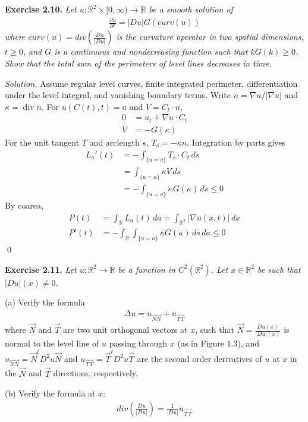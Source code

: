\documentclass[12pt,letterpaper]{article}
\newcommand{\R}{\mathbb R}
\newcommand{\diver}{\operatorname{div}}
\newcommand{\exercise}[1]{%
  \par\bigskip\noindent\textbf{Exercise #1.}\enspace}
\newenvironment{statement}{\itshape\ignorespaces}{\par}
\newcommand{\solution}{\par\medskip\noindent\textit{Solution.}\enspace}
\newcommand{\finish}{\qed\par}
\begin{document}
\begin{samepage}
\exercise{2.10}
\begin{statement}
Let $u:\mathbb R^2\times[0,\infty)\to\mathbb R$ be a smooth solution of
\begin{align*}
\frac{\partial u}{\partial t}=|Du|G(curv(u))
\end{align*}
where $curv(u)=div\left(\frac{Du}{|Du|}\right)$ is the curvature operator in two spatial dimensions, $t\ge0$, and $G$ is a continuous and nondecreasing function such that $kG(k)\ge0$. Show that the total sum of the perimeters of level lines decreases in time.
\end{statement}
\end{samepage}

\solution
Assume regular level curves, finite integrated perimeter, differentiation
under the level integral, and vanishing boundary terms. Write $n=\nabla u/|\nabla u|$ and $\kappa=\diver n$.
For $u(C(t),t)=a$ and $V=C_t\cdot n$,
\begin{align*}
 0&=u_t+\nabla u\cdot C_t\\
 V&=-G(\kappa)
\end{align*}
For the unit tangent $T$ and arclength $s$, $T_s=-\kappa n$.
Integration by parts gives
\begin{align*}
 L_a'(t)&=-\int_{\{u=a\}}T_s\cdot C_t\,ds\\
 &=\int_{\{u=a\}}\kappa V\,ds\\
 &=-\int_{\{u=a\}}\kappa G(\kappa)\,ds\le0
\end{align*}
By coarea,
\begin{align*}
 P(t)&=\int_\R L_a(t)\,da
       =\int_{\R^2}|\nabla u(x,t)|\,dx\\
 P'(t)&=-\int_\R\int_{\{u=a\}}\kappa G(\kappa)\,ds\,da\le0
\end{align*}
\finish

\newpage
\begin{samepage}
\exercise{2.11}
\begin{statement}
Let $u:\mathbb R^2\to\mathbb R$ be a function in $C^2(\mathbb R^2)$. Let $x\in\mathbb R^2$ be such that $|Du|(x)\ne0$.
\par\smallskip
(a) Verify the formula
\begin{align*}
\Delta u=u_{\vec N\vec N}+u_{\vec T\vec T}
\end{align*}
where $\vec N$ and $\vec T$ are two unit orthogonal vectors at $x$, such that $\vec N=\frac{Du(x)}{|Du|(x)}$ is normal to the level line of $u$ passing through $x$ (as in Figure 1.3), and $u_{\vec N\vec N}=\vec N^tD^2u\vec N$ and $u_{\vec T\vec T}=\vec T^tD^2u\vec T$ are the second order derivatives of $u$ at $x$ in the $\vec N$ and $\vec T$ directions, respectively.
\par\smallskip
(b) Verify the formula at $x$:
\begin{align*}
div\left(\frac{Du}{|Du|}\right)=\frac1{|Du|}u_{\vec T\vec T}
\end{align*}
\end{statement}
\end{samepage}
\end{document}

